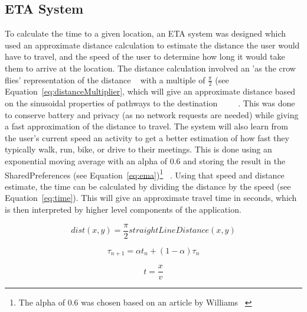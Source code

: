 \subsection{ETA System}
To calculate the time to a given location, an ETA system was designed which used an approximate distance calculation to estimate the distance the user would have to travel, and the speed of the user to determine how long it would take them to arrive at the location. The distance calculation involved an 'as the crow flies' representation of the distance ~\cite{androidlocation} with a multiple of $\frac{\pi}{2}$ (see Equation~\ref{eq:distanceMultiplier}, which will give an approximate distance based on the sinusoidal properties of pathways to the destination ~\cite{numberphile2014pi} ~\cite{edwards2004crow} ~\cite{lembo2003crow}. This was done to conserve battery and privacy (as no network requests are needed) while giving a fast approximation of the distance to travel. The system will also learn from the user's current speed an activity to get a better estimation of how fast they typically walk, run, bike, or drive to their meetings. This is done using an exponential moving average with an alpha of 0.6 and storing the result in the SharedPreferences (see Equation~\ref{eq:ema})\footnote{The alpha of 0.6 was chosen based on an article by Williams ~\cite{williams1998urban}} ~\cite{williams1998urban}. Using that speed and distance estimate, the time can be calculated by dividing the distance by the speed (see Equation~\ref{eq:time}). This will give an approximate travel time in seconds, which is then interpreted by higher level components of the application.

\begin{equation}\label{eq:distanceMultiplier}
	dist(x, y) = \frac{\pi}{2} straightLineDistance(x, y)
\end{equation}

\begin{equation}\label{eq:ema}
	\tau_{n+1} = \alpha t_n + (1 - \alpha) \tau_n
\end{equation}

\begin{equation}\label{eq:time}
	t = \frac{x}{v}
\end{equation}